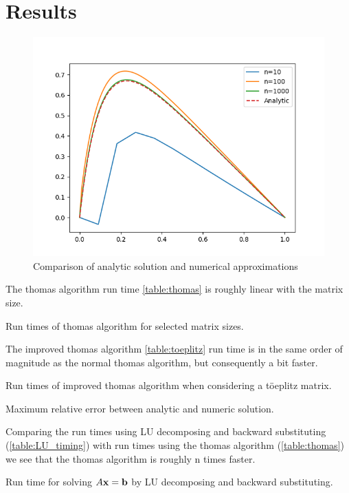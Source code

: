 \section*{Results}

\begin{figure}[H]
  \centering
  \includegraphics[width=\textwidth]{../figures/thomas.png}
  \caption{Comparison of analytic solution and numerical approximations}
  \label{fig:a}
\end{figure}


The thomas algorithm run time \cref{table:thomas} is roughly linear with the
matrix size.

\begin{table}[h]
  \centering
  \caption{Run times of thomas algorithm for selected matrix sizes.}
  \label{table:thomas}
\end{table}

The improved thomas algorithm \cref{table:toeplitz} run time is in the same
order of magnitude as the normal thomas algorithm, but consequently a bit faster.

\begin{table}[h]
  \centering
  \caption{Run times of improved thomas algorithm when considering a töeplitz matrix.}
  \label{table:toeplitz}
\end{table}

\begin{table}[h]
  \centering
  \caption{Maximum relative error between analytic and numeric solution.}
  \label{table:relative_error}
\end{table}

Comparing the run times using LU decomposing and backward substituting
(\cref{table:LU_timing}) with run times using the thomas algorithm
(\cref{table:thomas}) we see that the thomas algorithm is roughly n times
faster.

\begin{table}[h]
  \centering
  \caption{Run time for solving $A\mathbf{x} = \mathbf{b}$ by LU decomposing and backward substituting.}
  \label{table:LU_timing}
\end{table}
